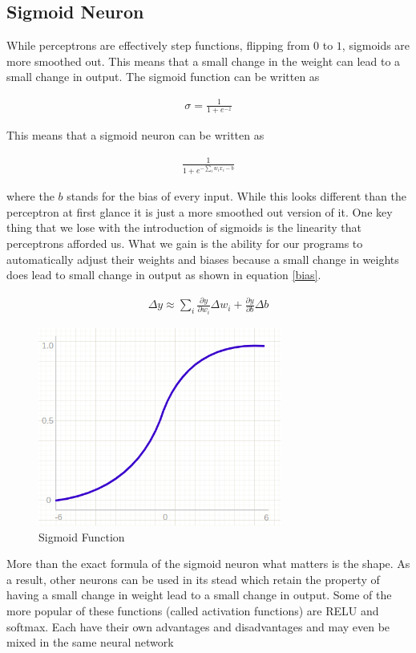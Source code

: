 \subsection{Sigmoid Neuron}

While perceptrons are effectively step functions, flipping from $0$ to $1$, sigmoids are more smoothed out.
This means that a small change in the weight can lead to a small change in output\cite{Nielson_2020}.
The sigmoid function can be written as

\begin{align}
  \sigma = \frac{1}{1 + e^{-z}}
\end{align}

This means that a sigmoid neuron can be written as

\begin{align}
  \frac{1}{1 + e^{-\sum_i w_i x_i - b}}
\end{align}

where the $b$ stands for the bias of every input.
While this looks different than the perceptron at first glance it is just a more smoothed out version of it.
One key thing that we lose with the introduction of sigmoids is the linearity that perceptrons afforded us.
What we gain is the ability for our programs to automatically adjust their weights and biases because a small change in weights does lead to small change in output as shown in equation \ref{bias}.

\begin{align}\label{bias}
  \Delta y \approx \sum_i \frac{\partial y}{\partial w_i}\Delta w_i + \frac{\partial y}{\partial b}\Delta b
\end{align}

\begin{figure}[H]
  \centering
  \includegraphics[width=80mm]{figures/sigmoid.png}
  \caption{Sigmoid Function \cite{Potrimba_2023}}
  \label{network}
\end{figure}

More than the exact formula of the sigmoid neuron what matters is the shape.
As a result, other neurons can be used in its stead which retain the property of having a small change in weight lead to a small change in output.
Some of the more popular of these functions (called activation functions) are RELU and softmax.
Each have their own advantages and disadvantages and may even be mixed in the same neural network

